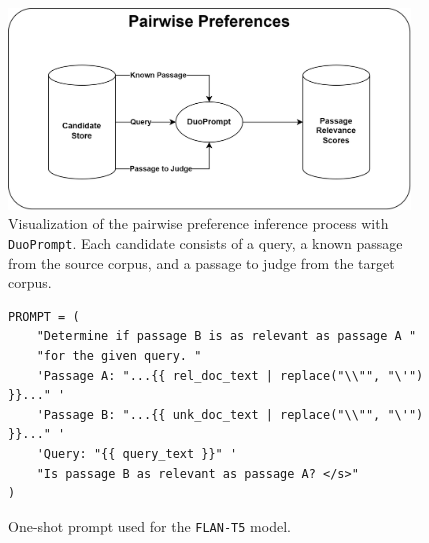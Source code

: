 \begin{figure}[ht]
    \centering
    \includegraphics[width=0.95\textwidth]{./graphics/drawio/pairwise_preferences.png}
    \caption{Visualization of the pairwise preference inference process with \texttt{DuoPrompt}. Each candidate consists of a query, a known passage from the source corpus, and a passage to judge from the target corpus.}
    \label{fig:pairwise-preferences}
\end{figure}

\begin{figure}[ht]
    \centering
    \begin{tcolorbox}[title=One-Shot Prompt, width=0.95\textwidth]
        \footnotesize
        \begin{verbatim}
PROMPT = (
    "Determine if passage B is as relevant as passage A "
    "for the given query. "
    'Passage A: "...{{ rel_doc_text | replace("\\"", "\'") }}..." '
    'Passage B: "...{{ unk_doc_text | replace("\\"", "\'") }}..." '
    'Query: "{{ query_text }}" '
    "Is passage B as relevant as passage A? </s>"
)
        \end{verbatim}
    \end{tcolorbox}
    \caption{One-shot prompt used for the \texttt{FLAN-T5} model.}
    \label{fig:oneshot-prompt}
\end{figure}

